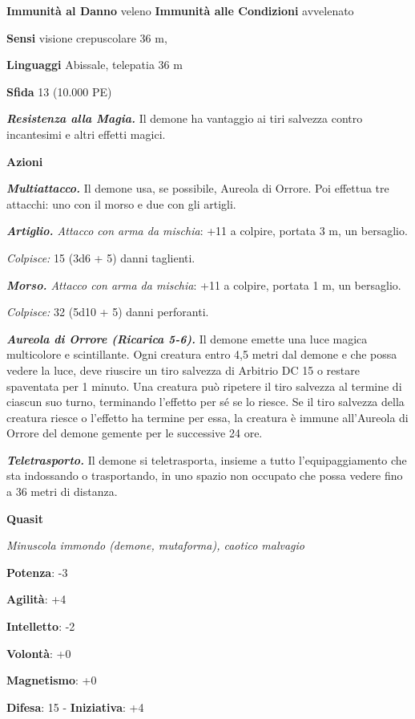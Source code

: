 \begin{multicols}{2}
\textbf{Immunità al Danno} veleno \textbf{Immunità alle Condizioni}
avvelenato

\textbf{Sensi} visione crepuscolare 36 m, 

\textbf{Linguaggi} Abissale, telepatia 36 m 

\textbf{Sfida} 13 (10.000 PE)\smallskip

\emph{\textbf{Resistenza alla Magia.}} Il demone ha vantaggio ai tiri
salvezza contro incantesimi e altri effetti magici.

\smallskip\textbf{Azioni}

\emph{\textbf{Multiattacco.}} Il demone usa, se possibile, Aureola di
Orrore. Poi effettua tre attacchi: uno con il morso e due con gli
artigli.

\emph{\textbf{Artiglio.} Attacco con arma da mischia}: +11 a colpire,
portata 3 m, un bersaglio.

\emph{Colpisce:} 15 (3d6 + 5) danni taglienti.

\emph{\textbf{Morso.} Attacco con arma da mischia}: +11 a colpire,
portata 1 m, un bersaglio.

\emph{Colpisce:} 32 (5d10 + 5) danni perforanti.

\emph{\textbf{Aureola di Orrore (Ricarica 5-6).}} Il demone emette una
luce magica multicolore e scintillante. Ogni creatura entro 4,5 metri
dal demone e che possa vedere la luce, deve riuscire un tiro salvezza di Arbitrio DC 15 o restare spaventata per 1 minuto. Una creatura può
ripetere il tiro salvezza al termine di ciascun suo turno, terminando
l'effetto per sé se lo riesce. Se il tiro salvezza della creatura riesce
o l'effetto ha termine per essa, la creatura è immune all'Aureola di
Orrore del demone gemente per le successive 24 ore.

\emph{\textbf{Teletrasporto.}} Il demone si teletrasporta, insieme a
tutto l'equipaggiamento che sta indossando o trasportando, in uno spazio
non occupato che possa vedere fino a 36 metri di distanza.



\textbf{Quasit}

\emph{Minuscola immondo (demone, mutaforma), caotico malvagio}

\textbf{Potenza}: -3

\textbf{Agilità}: +4

\textbf{Intelletto}: -2

\textbf{Volontà}: +0

\textbf{Magnetismo}: +0

\textbf{Difesa}: 15 - \textbf{Iniziativa}: +4


\end{multicols}
